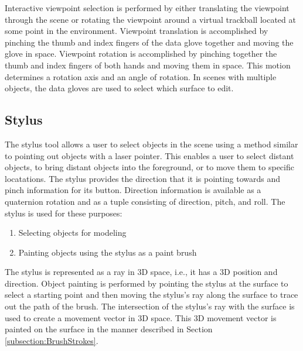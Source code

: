 \documentclass[10pt,twocolumn]{article}
\begin{document}
Interactive viewpoint selection is performed by either translating the viewpoint through the scene
or rotating the viewpoint around a virtual trackball located at some point in the environment.
Viewpoint translation is accomplished by pinching the thumb and index fingers of the data glove 
together and moving the glove in space. 
Viewpoint rotation is accomplished by pinching together the thumb and index fingers
of both hands and moving them in space. This motion determines a rotation axis 
and an angle of rotation. 
In scenes with multiple objects, the data gloves are used to select 
which surface to edit.


\subsection{Stylus}
\indent The stylus tool allows a user to select objects in the scene
using a method similar to pointing out objects with a laser pointer.
This enables a user to select distant objects, to bring distant objects
into the foreground, or to move them to specific locatations. 
The stylus provides the direction that it is pointing towards 
and pinch information for its button.  Direction information is available
as a quaternion rotation and as a tuple consisting of direction, pitch, and roll.
The stylus is used for these purposes:
\begin{enumerate}

\item Selecting objects for modeling
\item Painting objects using the stylus as a paint brush 

\end{enumerate}

The stylus is represented as a ray in 3D space, i.e., it has a 3D position and direction.
Object painting is performed by pointing the stylus at the surface to select
a starting point and then moving the stylus's ray along the surface to trace
out the path of the brush.
The intersection of the stylus's ray with the surface is used to 
create a movement vector in 3D space.
This 3D movement vector is painted on the surface in the manner 
described in Section \ref{subsection:BrushStrokes}.
\end{document}
